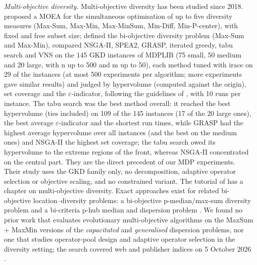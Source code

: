 \emph{Multi-objective diversity.} Multi-objective diversity has been studied since 2018. \citet{vera2018} proposed a MOEA for the simultaneous optimisation of up to five diversity measures (Max-Sum, Max-Min, Max-MinSum, Min-Diff, Min-P-center), with fixed and free subset size; \citet{colmenar2018} defined the bi-objective diversity problem (Max-Sum and Max-Min), compared NSGA-II, SPEA2, GRASP, iterated greedy, tabu search and VNS on the 145 GKD instances of MDPLIB (75 small, 50 medium and 20 large, with n up to 500 and m up to 50), each method tuned with irace on 29 of the instances (at most 500 experiments per algorithm; more experiments gave similar results) and judged by hypervolume (computed against the origin), set coverage and the $\varepsilon$-indicator, following the guidelines of \citet{knowles2006}, with 10 runs per instance. The tabu search was the best method overall: it reached the best hypervolume (ties included) on 109 of the 145 instances (17 of the 20 large ones), the best average $\varepsilon$-indicator and the shortest run times, while GRASP had the highest average hypervolume over all instances (and the best on the medium ones) and NSGA-II the highest set coverage; the tabu search owed its hypervolume to the extreme regions of the front, whereas NSGA-II concentrated on the central part. They are the direct precedent of our MDP experiments. Their study uses the GKD family only, no decomposition, adaptive operator selection or objective scaling, and no constrained variant. The tutorial of \citet{marti2023} has a chapter on multi-objective diversity. Exact approaches exist for related bi-objective location--diversity problems: a bi-objective p-median/max-sum diversity problem \citep{yang2026} and a bi-criteria p-hub median and dispersion problem \citep{ramamoorthy2024}. We found no prior work that evaluates evolutionary multi-objective algorithms on the MaxSum + MaxMin versions of the \emph{capacitated} and \emph{generalised} dispersion problems, nor one that studies operator-pool design and adaptive operator selection in the diversity setting; the search covered web and publisher indices on 5 October 2026 .

